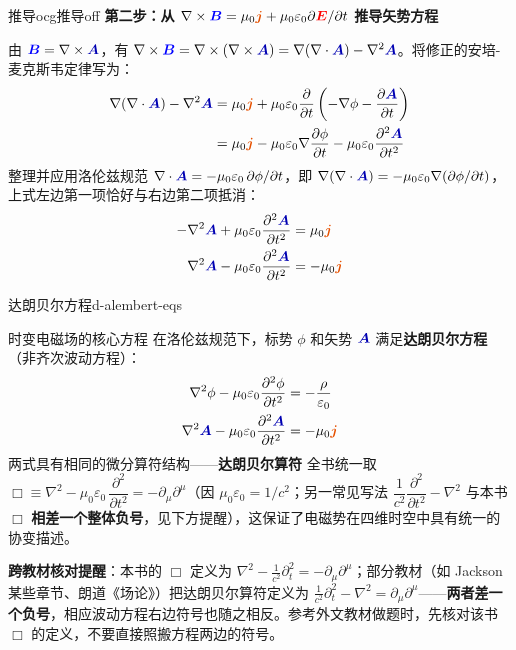 \documentclass[11pt,a4paper,openany,oneside]{book}
\newcommand{\vecE}{\textcolor{red}{\vect{E}}}
\newcommand{\vecB}{\textcolor{blue}{\vect{B}}}
\newcommand{\vecJ}{\textcolor{cororange}{\vect{j}}}
\newcommand{\vecA}{\textcolor{blue!70!black}{\vect{A}}}
\newcommand{\eps}{\varepsilon}
\newcommand{\muz}{\mu_0}
\newcommand{\vect}[1]{\bm{#1}}
\newcommand{\grad}{\nabla}
\newcommand{\curl}{\nabla\times}
\newcommand{\divg}{\nabla\cdot}
\newcommand{\lap}{\nabla^2}
\begin{document}
\begin{ocg}{推导}{ocg推导}{off}
\textbf{第二步：从 $\curl\vecB = \muz\vecJ + \muz\eps_0\partial\vecE/\partial t$ 推导矢势方程}

由 $\vecB = \curl\vecA$，有 $\curl\vecB = \curl(\curl\vecA) = \grad(\divg\vecA) - \lap\vecA$。将修正的安培-麦克斯韦定律写为：
\begin{align*}
\grad(\nabla\cdot\vecA) - \lap\vecA &= \muz\vecJ + \muz\eps_0\frac{\partial}{\partial t}\left(-\grad\phi - \frac{\partial\vecA}{\partial t}\right) \\
&= \muz\vecJ - \muz\eps_0\grad\frac{\partial\phi}{\partial t} - \muz\eps_0\frac{\partial^2\vecA}{\partial t^2}
\end{align*}
整理并应用洛伦兹规范 $\nabla\cdot\vecA = -\muz\eps_0\,\partial\phi/\partial t$，即 $\grad(\nabla\cdot\vecA) = -\muz\eps_0\grad(\partial\phi/\partial t)$，上式左边第一项恰好与右边第二项抵消：
\begin{align*}
-\lap\vecA + \muz\eps_0\frac{\partial^2\vecA}{\partial t^2} &= \muz\vecJ \\
\lap\vecA - \muz\eps_0\frac{\partial^2\vecA}{\partial t^2} &= -\muz\vecJ
\end{align*}

\begin{theorem}{达朗贝尔方程}{d-alembert-eqs}
\begin{impEqbox}{时变电磁场的核心方程}
在洛伦兹规范下，标势 $\phi$ 和矢势 $\vecA$ 满足\textbf{达朗贝尔方程}（非齐次波动方程）：
\begin{align}
\lap\phi - \muz\eps_0\frac{\partial^2\phi}{\partial t^2} &= -\frac{\rho}{\eps_0} \label{eq:d-alembert-phi} \\
\lap\vecA - \muz\eps_0\frac{\partial^2\vecA}{\partial t^2} &= -\muz\vecJ \label{eq:d-alembert-A}
\end{align}
两式具有相同的微分算符结构——\textbf{达朗贝尔算符} 全书统一取 $\Box \equiv \lap - \muz\eps_0\,\dfrac{\partial^2}{\partial t^2} = -\partial_\mu\partial^\mu$（因 $\muz\eps_0 = 1/c^2$；另一常见写法 $\dfrac{1}{c^2}\dfrac{\partial^2}{\partial t^2} - \lap$ 与本书 $\Box$ \textbf{相差一个整体负号}，见下方提醒），这保证了电磁势在四维时空中具有统一的协变描述。

\textbf{跨教材核对提醒}：本书的 $\Box$ 定义为 $\nabla^2 - \frac{1}{c^2}\partial_t^2 = -\partial_\mu\partial^\mu$；部分教材（如 Jackson 某些章节、朗道《场论》）把达朗贝尔算符定义为 $\frac{1}{c^2}\partial_t^2 - \nabla^2 = \partial_\mu\partial^\mu$——\textbf{两者差一个负号}，相应波动方程右边符号也随之相反。参考外文教材做题时，先核对该书 $\Box$ 的定义，不要直接照搬方程两边的符号。
\end{impEqbox}
\end{theorem}
\end{ocg}
\end{document}
